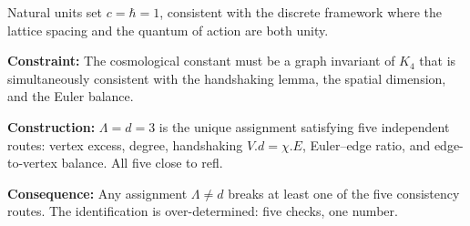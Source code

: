 \documentclass[11pt,a4paper]{book}
\def\cdot{.}%
\def\texttt#1{#1}%
\begin{document}
Natural units set $c = \hbar = 1$, consistent with the discrete framework where the lattice spacing and the quantum of action are both unity.

\textbf{Constraint:} The cosmological constant must be a graph invariant of $K_4$ that is simultaneously consistent with the handshaking lemma, the spatial dimension, and the Euler balance.

\textbf{Construction:} $\Lambda = d = 3$ is the unique assignment satisfying five independent routes: vertex excess, degree, handshaking $V \cdot d = \chi \cdot E$, Euler--edge ratio, and edge-to-vertex balance. All five close to \texttt{refl}.

\textbf{Consequence:} Any assignment $\Lambda \neq d$ breaks at least one of the five consistency routes. The identification is over-determined: five checks, one number.
\end{document}
